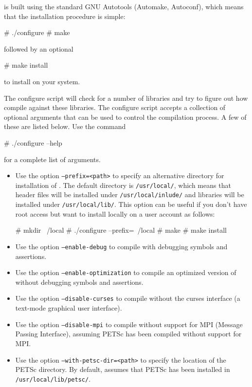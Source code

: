 \dolfin{} is built using the standard GNU Autotools (Automake,
Autoconf), which means that the installation procedure is simple:
\begin{code}
  # ./configure
  # make
\end{code}
followed by an optional
\begin{code}
  # make install
\end{code}
to install \dolfin{} on your system.

The configure script will check for a number of libraries and try
to figure out how compile \dolfin{} against these libraries. The
configure script accepts a collection of optional arguments that can be
used to control the compilation process. A few of these are listed
below. Use the command
\begin{code}
  # ./configure --help
\end{code}
for a complete list of arguments.

\begin{itemize}
\item
  Use the option \texttt{--prefix=<path>} to specify an alternative
  directory for installation of \dolfin{}. The default directory is
  \texttt{/usr/local/}, which means that header files will be
  installed under \texttt{/usr/local/inlude/} and libraries will be
  installed under \texttt{/usr/local/lib/}. This option can be useful
  if you don't have root access but want to install \dolfin{} locally
  on a user account as follows:
  \begin{code}
    # mkdir ~/local
    # ./configure --prefix=~/local
    # make
    # make install
  \end{code}
\item
  Use the option \texttt{--enable-debug} to compile \dolfin{} with
  debugging symbols and assertions.
\item
  Use the option \texttt{--enable-optimization} to compile an
  optimized version of \dolfin{} without debugging symbols
  and assertions.
\item
  Use the option \texttt{--disable-curses} to compile \dolfin{}
  without the curses interface (a text-mode graphical user interface).
\item
  Use the option \texttt{--disable-mpi} to compile \dolfin{} without
  support for MPI (Message Passing Interface), assuming PETSc has been
  compiled without support for MPI.
\item
  Use the option \texttt{--with-petsc-dir=<path>} to specify the
  location of the PETSc directory. By default, \dolfin{} assumes that
  PETSc has been installed in \texttt{/usr/local/lib/petsc/}.
\end{itemize}


